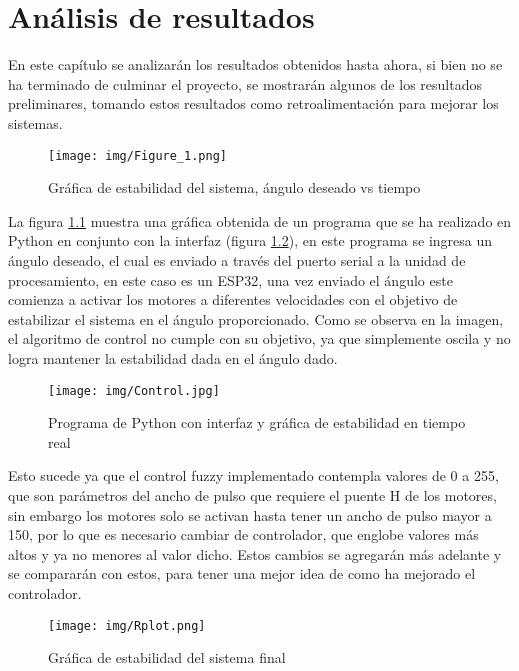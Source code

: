 \chapter{Análisis de resultados}
\label{aresultados}
En este capítulo se analizarán los resultados obtenidos hasta ahora, si bien no se ha terminado de culminar el proyecto, se mostrarán algunos de los resultados preliminares, tomando estos resultados como retroalimentación para mejorar los sistemas.

\begin{figure}[H]
    \centering	
    \texttt{[image: img/Figure\_1.png]} 
    \caption{Gráfica de estabilidad del sistema, ángulo deseado vs tiempo}
	\label{fig:simulacionControlPython}
\end{figure}

La figura  \ref{fig:simulacionControlPython} muestra una gráfica obtenida de un programa que se ha realizado en Python en conjunto con la interfaz (figura \ref{fig:simulacionControlPython2}), en este programa se ingresa un ángulo deseado, el cual es enviado a través del puerto serial a la unidad de procesamiento, en este caso es un ESP32, una vez enviado el ángulo este comienza a activar los motores a diferentes velocidades con el objetivo de estabilizar el sistema en el ángulo proporcionado. Como se observa en la imagen, el algoritmo de control no cumple con su objetivo, ya que simplemente oscila y no logra mantener la estabilidad dada en el ángulo dado.

\begin{figure}[H]
    \centering	
    \texttt{[image: img/Control.jpg]} 
    \caption{Programa de Python con interfaz y gráfica de estabilidad en tiempo real}
	\label{fig:simulacionControlPython2}
\end{figure}

Esto sucede ya que el control fuzzy implementado contempla valores de 0 a 255, que son parámetros del ancho de pulso que requiere el puente H de los motores, sin embargo los motores solo se activan hasta tener un ancho de pulso mayor a 150, por lo que es necesario cambiar de controlador, que englobe valores más altos y ya no menores al valor dicho.
Estos cambios se agregarán más adelante y se compararán con estos, para tener una mejor idea de como ha mejorado el controlador.

\begin{figure}[H]
    \centering	
    \texttt{[image: img/Rplot.png]} 
    \caption{ Gráfica de estabilidad del sistema final}
	\label{fig:simulacionControlR}
\end{figure}

